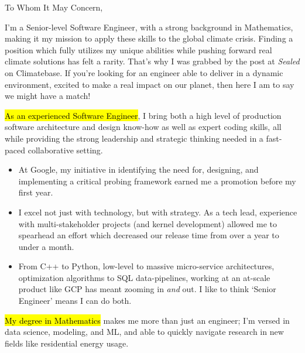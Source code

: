 \documentclass{tc_cv}
\begin{document}

\begin{adjustwidth}{40pt}{40pt}
  \large

  To Whom It May Concern, \par \bigbreak

  I'm a Senior-level Software Engineer, with a strong background in
  Mathematics, making it my mission to apply these skills to the global climate
  crisis. Finding a position which fully utilizes my unique abilities while
  pushing forward real climate solutions has felt a rarity. That's why I was
  grabbed by the post at \emph{Sealed} on Climatebase. If you're looking for an
  engineer able to deliver in a dynamic environment, excited to make a real
  impact on our planet, then here I am to say we might have a match!\medbreak

  \hl{As an experienced Software Engineer}, I bring both a high level of
  production software architecture and design know-how as well as expert coding
  skills, all while providing the strong leadership and strategic thinking
  needed in a fast-paced collaborative setting.
  \begin{itemize}

    \item At Google, my initiative in identifying the need for, designing, and
      implementing a critical probing framework earned me a promotion before my
      first year. %

    \item I excel not just with technology, but with strategy. As a tech lead,
      experience with multi-stakeholder projects (and kernel development)
      allowed me to spearhead an effort which decreased our release time from
      over a year to under a month.

    \item From C++ to Python, low-level to massive micro-service architectures,
      optimization algorithms to SQL data-pipelines, working at an at-scale
      product like GCP has meant zooming in \emph{and} out. I like to think
      `Senior Engineer' means I can do both.

  \end{itemize} \medskip

  \hl{My degree in Mathematics} makes me more than just an engineer; I'm versed
  in data science, modeling, and ML, and able to quickly navigate research in
  new fields like residential energy usage.


\end{adjustwidth}
\end{document}
